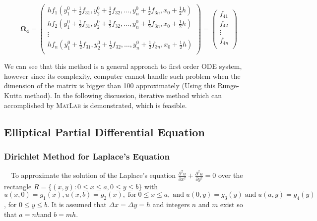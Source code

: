 \documentclass[a4paper]{article}
\newcommand{\tmop}[1]{\ensuremath{\operatorname{#1}}}
\begin{document}
\begin{equation}
{{\mathbf{\Omega }}_{\mathbf{4}}}=\left( \begin{matrix}
   h{{f}_{1}}(y_{1}^{0}+\tfrac{1}{2}{{f}_{31}},y_{2}^{0}+\tfrac{1}{2}{{f}_{32}},\ldots ,y_{n}^{0}+\tfrac{1}{2}{{f}_{3n}},{{x}_{0}}+\tfrac{1}{2}h)  \\
   h{{f}_{2}}(y_{1}^{0}+\tfrac{1}{2}{{f}_{31}},y_{2}^{0}+\tfrac{1}{2}{{f}_{32}},\ldots ,y_{n}^{0}+\tfrac{1}{2}{{f}_{3n}},{{x}_{0}}+\tfrac{1}{2}h)  \\
   \vdots   \\
   h{{f}_{n}}(y_{1}^{0}+\tfrac{1}{2}{{f}_{31}},y_{2}^{0}+\tfrac{1}{2}{{f}_{32}},\ldots ,y_{n}^{0}+\tfrac{1}{2}{{f}_{3n}},{{x}_{0}}+\tfrac{1}{2}h)  \\
\end{matrix} \right)=\left( \begin{matrix}
   {{f}_{41}}  \\
   {{f}_{42}}  \\
   \vdots   \\
   {{f}_{4n}}  \\
\end{matrix} \right)
\end{equation}


We can see that this method is a general approach to first order ODE system, however since its complexity, computer cannot handle such problem when the dimension of the matrix is bigger than 100 approximately (Using this Runge-Kutta method). In the following discussion, iterative method which can accomplished by \textsc{MatLab} is demonstrated, which is feasible.


\subsection{Elliptical Partial Differential Equation}

\subsubsection{Dirichlet Method for Laplace's Equation}

\ \ To approximate the solution of the Laplace's equation $\frac{\partial^2
u}{\partial x^2} + \frac{\partial^2 u}{\partial y^2} = 0$ over the rectangle
$R =\{(x, y) : 0 \leqslant x \leqslant a, 0 \leqslant y \leqslant b\}$ with $u
(x, 0) = g_1 (x), u (x, b) = g_2 (x), \tmop{for} 0 \leqslant x \leqslant a,
\tmop{and} u (0, y) = g_3 (y) \tmop{and} u (a, y) = g_4 (y)$, for $0 \leqslant
y \leqslant b$. It is assumed that $\Delta x = \Delta y = h$ and integers $n$
and $m$ exist so that $a = n h$and $b = m h$.
\end{document}
